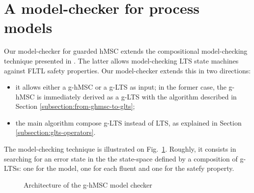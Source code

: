 \section{A model-checker for process models\label{section:tool-model-checker}}

Our model-checker for guarded hMSC extends the compositional model-checking technique presented in \cite{Giannakopoulou:2003}. The latter allows model-checking LTS state machines against FLTL safety properties. Our model-checker extends this in two directions:
\begin{itemize}
\item it allows either a g-hMSC or a g-LTS as input; in the former case, the g-hMSC is immediately derived as a g-LTS with the algorithm described in Section \ref{subsection:from-ghmsc-to-glts};
\item the main algorithm compose g-LTS instead of LTS, as explained in Section \ref{subsection:glts-operators}. 
\end{itemize}

The model-checking technique is illustrated on Fig.~\ref{image:model-checking-technique}. Roughly, it consists in searching for an error state in the the state-space defined by a composition of g-LTSs: one for the model, one for each fluent and one for the satefy property.

\begin{figure}[H]
\centering{}
  \caption{Architecture of the g-hMSC model checker\label{image:model-checking-technique}}
\end{figure}

